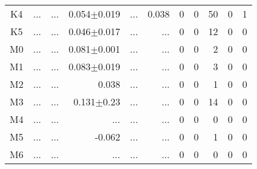 \begin{table}[t]
\begin{table}[t]
\begin{center}
\begin{tabular}{c|rrrrr|rrrrr}
    K4	&	 ...	&	 ...	&	0.054$\pm$0.019	&	 ...	&	0.038	&	0	&	0	&	50	&	0	&	1	\\
    K5	&	 ...	&	 ...	&	0.046$\pm$0.017	&	 ...	&	 ...	&	0	&	0	&	12	&	0	&	0	\\
    M0	&	 ...	&	 ...	&	0.081$\pm$0.001	&	 ...	&	 ...	&	0	&	0	&	2	&	0	&	0	\\
    M1	&	 ...	&	 ...	&	0.083$\pm$0.019	&	 ...	&	 ...	&	0	&	0	&	3	&	0	&	0	\\
    M2	&	 ...	&	 ...	&	0.038	&	 ...	&	 ...	&	0	&	0	&	1	&	0	&	0	\\
    M3	&	 ...	&	 ...	&	0.131$\pm$0.23	&	 ...	&	 ...	&	0	&	0	&	14	&	0	&	0	\\
    M4	&	 ...	&	 ...	&	 ...	&	 ...	&	 ...	&	0	&	0	&	0	&	0	&	0	\\
    M5	&	 ...	&	 ...	&	-0.062	&	 ...	&	 ...	&	0	&	0	&	1	&	0	&	0	\\
    M6	&	 ...	&	 ...	&	 ...	&	 ...	&	 ...	&	0	&	0	&	0	&	0	&	0	\\
        \bottomrule
        \end{tabular}
    \end{center}
    \end{table}
    

\end{table}
